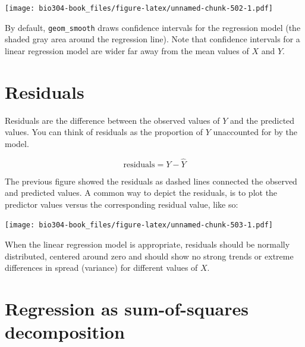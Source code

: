 \documentclass[]{book}
\newenvironment{Shaded}{\begin{snugshade}}{\end{snugshade}}
\newcommand{\DataTypeTok}[1]{\textcolor[rgb]{0.13,0.29,0.53}{#1}}
\newcommand{\DecValTok}[1]{\textcolor[rgb]{0.00,0.00,0.81}{#1}}
\newcommand{\KeywordTok}[1]{\textcolor[rgb]{0.13,0.29,0.53}{\textbf{#1}}}
\newcommand{\NormalTok}[1]{#1}
\newcommand{\OperatorTok}[1]{\textcolor[rgb]{0.81,0.36,0.00}{\textbf{#1}}}
\newcommand{\StringTok}[1]{\textcolor[rgb]{0.31,0.60,0.02}{#1}}
\theoremstyle{definition}
\theoremstyle{definition}
\theoremstyle{definition}
\theoremstyle{remark}
\begin{document}
\texttt{[image: bio304-book\_files/figure-latex/unnamed-chunk-502-1.pdf]}

By default, \texttt{geom\_smooth} draws confidence intervals for the
regression model (the shaded gray area around the regression line). Note
that confidence intervals for a linear regression model are wider far
away from the mean values of \(X\) and \(Y\).

\hypertarget{residuals}{%
\section{Residuals}\label{residuals}}

Residuals are the difference between the observed values of \(Y\) and
the predicted values. You can think of residuals as the proportion of
\(Y\) unaccounted for by the model.

\[
\mbox{residuals} = Y - \hat{Y}
\]

The previous figure showed the residuals as dashed lines connected the
observed and predicted values. A common way to depict the residuals, is
to plot the predictor values versus the corresponding residual value,
like so:

\begin{Shaded}
\end{Shaded}

\texttt{[image: bio304-book\_files/figure-latex/unnamed-chunk-503-1.pdf]}

When the linear regression model is appropriate, residuals should be
normally distributed, centered around zero and should show no strong
trends or extreme differences in spread (variance) for different values
of \(X\).

\hypertarget{regression-as-sum-of-squares-decomposition}{%
\section{Regression as sum-of-squares
decomposition}\label{regression-as-sum-of-squares-decomposition}}
\end{document}
